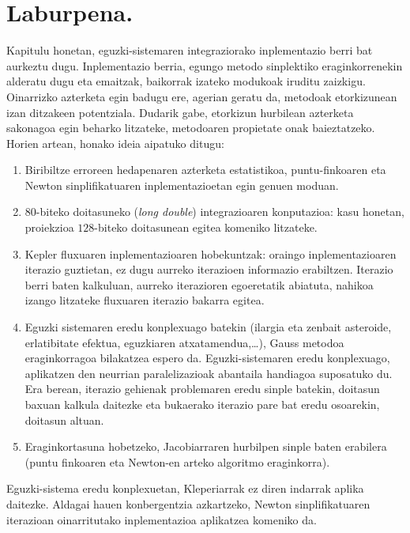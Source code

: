 \section{Laburpena.}


Kapitulu honetan, eguzki-sistemaren integraziorako inplementazio berri bat aurkeztu dugu. Inplementazio berria, egungo metodo sinplektiko eraginkorrenekin alderatu dugu eta emaitzak, baikorrak izateko modukoak iruditu zaizkigu. Oinarrizko azterketa egin badugu ere, agerian geratu da, metodoak etorkizunean izan ditzakeen potentziala. Dudarik gabe, etorkizun hurbilean azterketa sakonagoa egin beharko litzateke, metodoaren propietate onak baieztatzeko. Horien artean, honako ideia aipatuko ditugu:
\begin{enumerate}
\item Biribiltze erroreen hedapenaren azterketa estatistikoa, puntu-finkoaren eta Newton sinplifikatuaren inplementazioetan egin genuen moduan.
\item $80$-biteko doitasuneko (\emph{long double}) integrazioaren konputazioa: kasu honetan, proiekzioa $128$-biteko doitasunean egitea komeniko litzateke. 
\item Kepler fluxuaren inplementazioaren hobekuntzak: oraingo inplementazioaren iterazio guztietan, ez dugu aurreko iterazioen informazio erabiltzen. Iterazio berri baten kalkuluan, aurreko iterazioren egoeretatik abiatuta, nahikoa izango litzateke fluxuaren iterazio bakarra egitea.  
\item Eguzki sistemaren eredu konplexuago batekin (ilargia eta zenbait asteroide, erlatibitate efektua, eguzkiaren atxatamendua,\dots), Gauss metodoa eraginkorragoa bilakatzea espero da. Eguzki-sistemaren eredu konplexuago, aplikatzen den neurrian paralelizazioak abantaila handiagoa suposatuko du. Era berean, iterazio gehienak problemaren eredu sinple batekin, doitasun baxuan kalkula daitezke eta bukaerako iterazio pare bat eredu osoarekin, doitasun altuan.
\item Eraginkortasuna hobetzeko, Jacobiarraren hurbilpen sinple baten erabilera (puntu finkoaren eta Newton-en arteko algoritmo eraginkorra).  
\end{enumerate}    

Eguzki-sistema eredu konplexuetan, Kleperiarrak ez diren indarrak aplika daitezke. Aldagai hauen konbergentzia azkartzeko, Newton sinplifikatuaren iterazioan oinarritutako inplementazioa aplikatzea komeniko da.  

